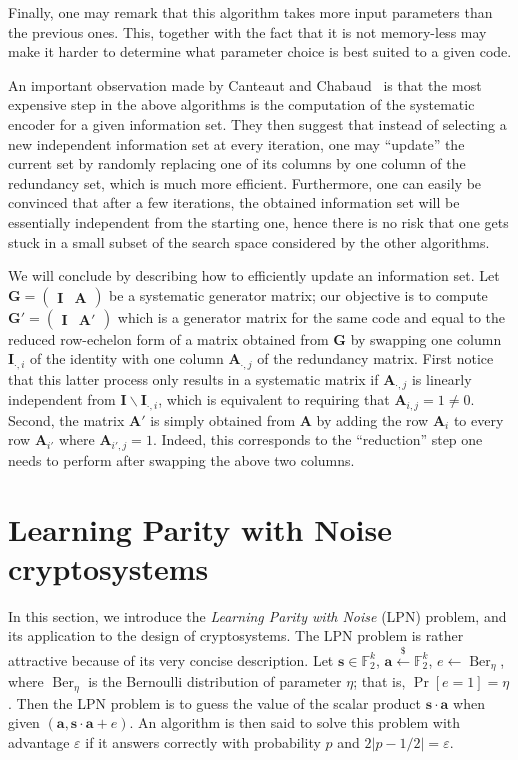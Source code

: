 \documentclass[11pt,a4paper]{article}
\theoremstyle{definition}
\DeclareMathOperator\Ber{Ber}
\newcommand\ftwo{\mathbb{F}_{2}}
\newcommand\randraw{\xleftarrow{{\scriptscriptstyle\$}}}
\begin{document}
Finally, one may remark that this algorithm takes more input parameters than the previous ones. This, together with the fact that it is not memory-less may make it harder to
determine what parameter choice is best suited to a given code.

\medskip

An important observation made by Canteaut and Chabaud~\cite{CanteautChabaud} is that the most expensive step in the above algorithms is the computation of the systematic encoder for a given
information set. They then suggest that instead of selecting a new independent information set at every iteration, one may ``update'' the current set by randomly replacing one
of its columns by one column of the redundancy set, which is much more efficient. Furthermore, one can easily be convinced that after a few iterations, the obtained information
set will be essentially independent from the starting one, hence there is no risk that one gets stuck in a small subset of the search space considered by the other algorithms.

We will conclude by describing how to efficiently update an information set. Let $\bm{G} = \begin{pmatrix}\bm{I} & \bm{A}\end{pmatrix}$ be a systematic generator matrix;
our objective is to compute $\bm{G}' = \begin{pmatrix}\bm{I} & \bm{A}'\end{pmatrix}$ which is a generator matrix for the same code and equal to the
reduced row-echelon form of a matrix obtained from $\bm{G}$ by swapping one column $\bm{I}_{\cdot,i}$ of the identity with one column
$\bm{A}_{\cdot,j}$ of the redundancy matrix. First notice that this latter
process only results in a systematic matrix if $\bm{A}_{\cdot,j}$ is linearly independent from $\bm{I}\backslash\bm{I}_{\cdot,i}$, which is equivalent to
requiring that $\bm{A}_{i,j} = 1 \neq 0$. Second, the matrix $\bm{A}'$ is simply obtained from $\bm{A}$ by adding the row $\bm{A}_{i}$
to every row $\bm{A}_{i'}$ where $\bm{A}_{i',j} = 1$. Indeed, this corresponds to the ``reduction'' step one needs to perform after swapping the above two columns.

\section{Learning Parity with Noise cryptosystems}

In this section, we introduce the \emph{Learning Parity with Noise} (LPN) problem, and its application to the design of cryptosystems.
The LPN problem is rather attractive because of its very concise description. Let $\bm{s} \in \ftwo^k$, $\bm{a} \randraw \ftwo^k$,
$e \leftarrow \Ber_\eta$, where $\Ber_\eta$ is the Bernoulli distribution of parameter $\eta$; that is,
$\Pr[e = 1] = \eta$. Then the LPN problem is to guess the value of the
scalar product $\bm{s} \cdot \bm{a}$ when given $(\bm{a},\bm{s} \cdot \bm{a} + e)$. An algorithm is then said to solve
this problem with advantage $\varepsilon$ if it answers correctly with probability $p$ and $2|p - 1/2| = \varepsilon$.
\end{document}
